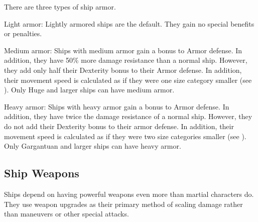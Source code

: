        There are three types of ship armor.
        \begin{raggeditemize}
            \item Light armor: Lightly armored ships are the default. They gain no special benefits or penalties.
            \item Medium armor: Ships with medium armor gain a  bonus to Armor defense.
                In addition, they have 50\% more damage resistance than a normal ship.
                However, they add only half their Dexterity bonus to their Armor defense.
                In addition, their movement speed is calculated as if they were one size category smaller (see ).
                Only Huge and larger ships can have medium armor.
            \item Heavy armor: Ships with heavy armor gain a  bonus to Armor defense.
                In addition, they have twice the damage resistance of a normal ship.
                However, they do not add their Dexterity bonus to their armor defense.
                In addition, their movement speed is calculated as if they were two size categories smaller (see ).
                Only Gargantuan and larger ships can have heavy armor.
        \end{raggeditemize}


    \subsection{Ship Weapons}\label{Ship Weapons}
        Ships depend on having powerful weapons even more than martial characters do.
        They use weapon upgrades as their primary method of scaling damage rather than maneuvers or other special attacks.

